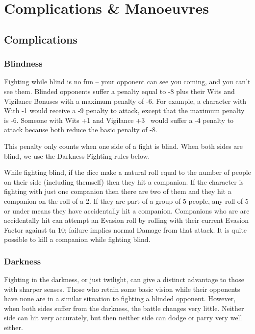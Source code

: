 \documentclass[titlepage,a4paper,openany]{book}
\begin{document}
\section{Complications \& Manoeuvres}

\begin{multicols}{2}

\subsection{Complications}

\subsubsection{Blindness}

Fighting while blind is no fun -- your opponent can see you coming, and you can't see them. Blinded opponents suffer a penalty equal to -8 plus their Wits and Vigilance Bonuses with a maximum penalty of -6. For example, a character with With -1 would receive a -9 penalty to attack, except that the maximum penalty is -6. Someone with Wits +1 and Vigilance +3 \ would suffer a -4 penalty to attack because both reduce the basic penalty of -8.

This penalty only counts when one side of a fight is blind. When both sides are blind, we use the Darkness Fighting rules below.

While fighting blind, if the dice make a \gls{natural} roll equal to the number of people on their side (including themself) then they hit a companion. If the character is fighting with just one companion then there are two of them and they hit a companion on the roll of a 2. If they are part of a group of 5 people, any roll of 5 or under means they have accidentally hit a companion. Companions who are are accidentally hit can attempt an Evasion roll by rolling with their current Evasion Factor against \gls{tn} 10; failure implies normal Damage from that attack. It is quite possible to kill a companion while fighting blind.

\subsubsection{Darkness}\label{darkness}

Fighting in the darkness, or just twilight, can give a distinct advantage to those with sharper senses.
Those who retain some basic vision while their opponents have none are in a similar situation to fighting a blinded opponent.
However, when both sides suffer from the darkness, the battle changes very little.
Neither side can hit very accurately, but then neither side can dodge or parry very well either.


\end{multicols}
\end{document}

